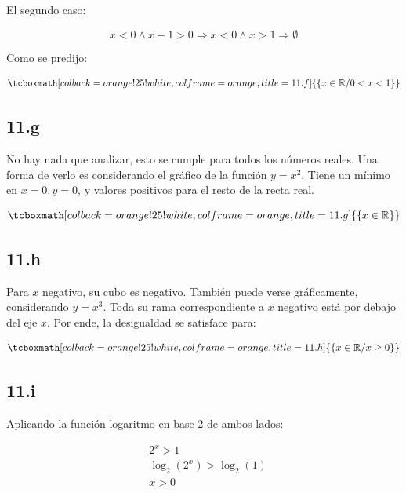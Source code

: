 \documentclass{article}
\newcommand{\hresult}[2]{\tcboxmath[colback=orange!25!white,colframe=orange, title=#1] {#2} }
\begin{document}
El segundo caso:

\begin{equation}
x < 0 \wedge x - 1 > 0 \Rightarrow x < 0 \wedge x > 1 \Rightarrow \emptyset
\end{equation}

Como se predijo:

\begin{equation}
\hresult{11.f}{ \{ x \in \mathbb{R} / 0 < x < 1 \} }
\end{equation}

\subsection*{11.g}
\label{subsec:11.g}

No hay nada que analizar, esto se cumple para todos los números reales. Una forma de verlo es considerando el gráfico de la función $y = x^2$. Tiene un mínimo en $x = 0, y = 0$, y valores positivos para el resto de la recta real.

\begin{equation}
\hresult{11.g}{ \{ x \in \mathbb{R} \} }
\end{equation}

\subsection*{11.h}
\label{subsec:11.h}

Para $x$ negativo, su cubo es negativo. También puede verse gráficamente, considerando $y = x^3$. Toda su rama correspondiente a $x$ negativo está por debajo del eje $x$. Por ende, la desigualdad se satisface para:

\begin{equation}
\hresult{11.h}{ \{ x \in \mathbb{R} / x \geq 0 \} }
\end{equation}

\subsection*{11.i}
\label{subsec:11.i}

Aplicando la función logaritmo en base 2 de ambos lados:

\begin{subequations}
\begin{align}
& 2^x > 1 \\
& \log_2(2^x) > \log_2(1) \\
& x > 0
\end{align}
\end{subequations}
\end{document}

